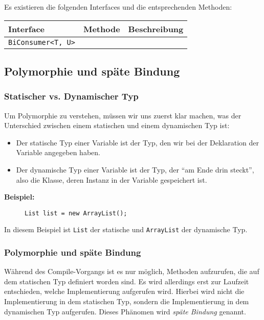 			Es existieren die folgenden Interfaces und die entsprechenden Methoden:
			\begin{table}[H]
				\centering
				\begin{tabular}{l | l | l}
					\textbf{Interface} & \textbf{Methode} & \textbf{Beschreibung} \\ \hline
					\lstinline|BiConsumer<T, U>| & & \\
				\end{tabular}
			\end{table}

\subsection{Polymorphie und späte Bindung}
	
	\subsubsection{Statischer vs. Dynamischer Typ}
		\label{sec:dynamic_static_type}
		
		Um Polymorphie zu verstehen, müssen wir uns zuerst klar machen, was der Unterschied zwischen einem statischen und einem dynamischen Typ ist:
		\begin{itemize}
			\item Der statische Typ einer Variable ist der Typ, den wir bei der Deklaration der Variable angegeben haben.
			\item Der dynamische Typ einer Variable ist der Typ, der \enquote{am Ende drin steckt}, also die Klasse, deren Instanz in der Variable gespeichert ist.
		\end{itemize}
	
		\textbf{Beispiel:}
		\begin{figure}[H]
			\centering
			\lstinline|List list = new ArrayList();|
		\end{figure}
		In diesem Beispiel ist \lstinline|List| der statische und \lstinline|ArrayList| der dynamische Typ.
	
	\subsubsection{Polymorphie und späte Bindung}
		Während des Compile-Vorgangs ist es nur möglich, Methoden aufzurufen, die auf dem statischen Typ definiert worden sind. Es wird allerdings erst zur Laufzeit entschieden, welche Implementierung aufgerufen wird. Hierbei wird nicht die Implementierung in dem statischen Typ, sondern die Implementierung in dem dynamischen Typ aufgerufen. Dieses Phänomen wird \textit{späte Bindung} genannt.
		
